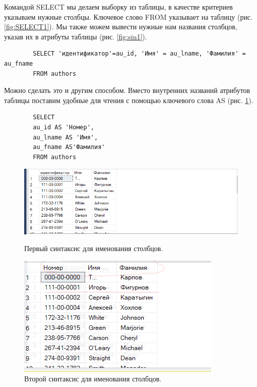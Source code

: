 Командой SELECT мы делаем выборку из таблицы, в качестве критериев указываем нужные столбцы. Ключевое слово FROM указывает на таблицу (рис. \ref{fig:SELECT1}). Мы также можем вывести нужные нам названия столбцов, указав их в атрибуты таблицы (рис. \ref{fig:sin1}).

\begin{verbatim}
        SELECT 'идентификатор'=au_id, 'Имя' = au_lname, 'Фамилия' = au_fname
        FROM authors
\end{verbatim}

Можно сделать это и другим способом. Вместо внутренних названий атрибутов таблицы поставим удобные для чтения с помощью ключевого слова AS (рис. \ref{fig:sin2}).

\begin{verbatim}
        SELECT 
        au_id AS 'Номер', 
        au_lname AS 'Имя', 
        au_fname AS'Фамилия' 
        FROM authors  
\end{verbatim}
\begin{figure}[h!]
    \begin{minipage}[p]{0.45\linewidth}
        \centering
        \includegraphics[width=\linewidth]{Pic/lab4/SQ2.PNG}
        \caption{Первый синтаксис для именования столбцов.}
        \label{fig:sin1}
    \end{minipage}
    \hfill
    \begin{minipage}[p]{0.45\linewidth}
        \centering
        \includegraphics[width=0.55\linewidth]{Pic/lab4/SQ3.PNG}
        \caption{Второй синтаксис для именования столбцов.}
        \label{fig:sin2}
    \end{minipage}
    
\end{figure}

